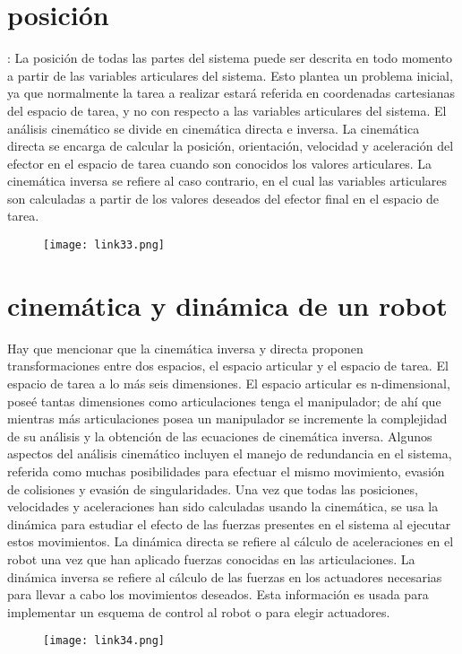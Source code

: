 \documentclass[11pt,a4paper,oldfontcommands,oneside]{memoir}
\begin{document}
\section{posición}
: La posición de todas las partes del sistema puede ser descrita en todo momento a partir de las variables articulares del sistema. Esto plantea un problema inicial, ya que normalmente la tarea a realizar estará referida en coordenadas cartesianas del espacio de tarea, y no con respecto a las variables articulares del sistema. El análisis cinemático se divide en cinemática directa e inversa. La cinemática directa se encarga de calcular la posición, orientación, velocidad y aceleración del efector en el espacio de tarea cuando son conocidos los valores articulares. La cinemática inversa se refiere al caso contrario, en el cual las variables articulares son calculadas a partir de los valores deseados del efector final en el espacio de tarea.

\begin{figure}[h]
\texttt{[image: link33.png]}
\end{figure}
\vspace{1.5cm}


\section{cinemática y dinámica de un robot}
Hay que mencionar que la cinemática inversa y directa proponen transformaciones entre dos espacios, el espacio articular y el espacio de tarea. El espacio de tarea a lo más seis dimensiones. El espacio articular es n-dimensional, poseé tantas dimensiones como articulaciones tenga el manipulador; de ahí que mientras más articulaciones posea un manipulador se incremente la complejidad de su análisis y la obtención de las ecuaciones de cinemática inversa. Algunos aspectos del análisis cinemático incluyen el manejo de redundancia en el sistema, referida como muchas posibilidades para efectuar el mismo movimiento, evasión de colisiones y evasión de singularidades. Una vez que todas las posiciones, velocidades y aceleraciones han sido calculadas usando la cinemática, se usa la dinámica para estudiar el efecto de las fuerzas presentes en el sistema al ejecutar estos movimientos. La dinámica directa se refiere al cálculo de aceleraciones en el robot una vez que han aplicado fuerzas conocidas en las articulaciones. La dinámica inversa se refiere al cálculo de las fuerzas en los actuadores necesarias para llevar a cabo los movimientos deseados. Esta información es usada para implementar un esquema de control al robot o para elegir actuadores.
\begin{figure}[h]
\texttt{[image: link34.png]}
\end{figure}
\end{document}
